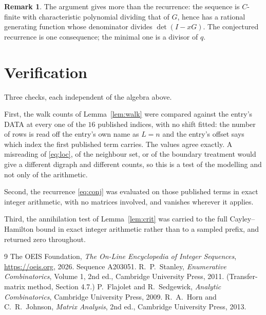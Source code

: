\documentclass[11pt,a4paper]{article}
\theoremstyle{plain}
\theoremstyle{definition}
\newtheorem{remark}[theorem]{Remark}
\begin{document}
\begin{remark}
The argument gives more than the recurrence: the sequence is $C$-finite with characteristic
polynomial dividing that of $G$, hence has a rational generating function whose denominator
divides $\det(I-xG)$. The conjectured recurrence is one consequence; the minimal one is a
divisor of $q$.
\end{remark}

\section{Verification}

Three checks, each independent of the algebra above.

First, the walk counts of Lemma~\ref{lem:walk} were compared against the entry's DATA at
every one of the $16$ published indices, with no shift fitted: the number of rows is
read off the entry's own name as $L=n$ and the entry's offset says which index the first
published term carries. The values agree exactly. A misreading of \eqref{eq:loc}, of the
neighbour set, or of the boundary treatment would give a different digraph and different
counts, so this is a test of the modelling and not only of the arithmetic.

Second, the recurrence \eqref{eq:conj} was evaluated on those published terms in exact
integer arithmetic, with no matrices involved, and vanishes wherever it applies.

Third, the annihilation test of Lemma~\ref{lem:crit} was carried to the full
Cayley--Hamilton bound in exact integer arithmetic rather than to a sampled prefix, and
returned zero throughout.

\begin{thebibliography}{9}
 The OEIS Foundation, \emph{The On-Line Encyclopedia of Integer
Sequences}, \url{https://oeis.org}, 2026. Sequence A203051.
 R.~P.~Stanley, \emph{Enumerative Combinatorics}, Volume 1, 2nd ed.,
Cambridge University Press, 2011. (Transfer-matrix method, Section 4.7.)
 P.~Flajolet and R.~Sedgewick, \emph{Analytic Combinatorics}, Cambridge
University Press, 2009.
 R.~A.~Horn and C.~R.~Johnson, \emph{Matrix Analysis}, 2nd ed., Cambridge
University Press, 2013.
\end{thebibliography}
\end{document}
